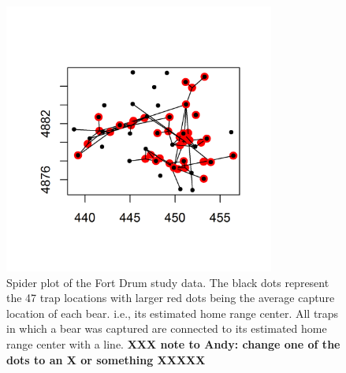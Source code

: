 \begin{figure}
\centering
\includegraphics[height=3.5in,width=3.5in]{Ch3-Closed/figs/bear_spiderplot.png}
\caption{Spider plot of the Fort Drum study data.
The black dots represent the 47 trap locations with larger red dots
being the average capture location of each bear. i.e., its estimated home
range center. All traps in which a bear was captured are connected to
its estimated home range center with a line.
{\bf XXX note to Andy: change one of the dots to an X or something
  XXXXX }
}
\label{closed.fig.spiderplot}
\end{figure}

